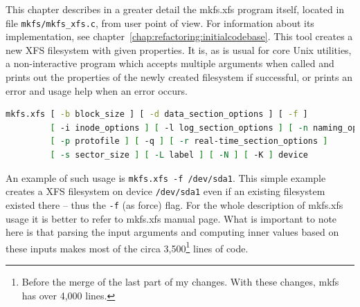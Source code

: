 This chapter describes in a greater detail the mkfs.xfs program itself, located
in file {\tt mkfs/mkfs\_xfs.c}, from user point of view. For information about
its implementation, see chapter~\ref{chap:refactoring:initialcodebase}. This
tool creates a new XFS filesystem with given properties. It is, as is usual for
core Unix utilities, a non-interactive program which accepts multiple arguments
when called and prints out the properties of the newly created filesystem if
successful, or prints an error and usage help when an error occurs.

\begin{lstlisting}[frame=none, basicstyle=\footnotesize\ttfamily, language=Bash, numbers=none, numberstyle=\tiny\color{black},caption= {Synopsis of mkfs.xfs utility~\cite{mkfs.xfsMan}.}]
mkfs.xfs [ -b block_size ] [ -d data_section_options ] [ -f ]
         [ -i inode_options ] [ -l log_section_options ] [ -n naming_options ]
         [ -p protofile ] [ -q ] [ -r real-time_section_options ]
         [ -s sector_size ] [ -L label ] [ -N ] [ -K ] device
\end{lstlisting}

An example of such usage is {\tt mkfs.xfs -f /dev/sda1}. This simple example creates a XFS filesystem on device {\tt /dev/sda1} even if an existing filesystem existed there -- thus the {\tt -f} (as force) flag. For the whole description of mkfs.xfs usage it is better to refer to mkfs.xfs manual page. What is important to note here is that parsing the input arguments and computing inner values based on these inputs makes most of the circa 3,500\footnote{Before the merge of the last part of my changes. With these changes, mkfs has over 4,000 lines.} lines of code.


